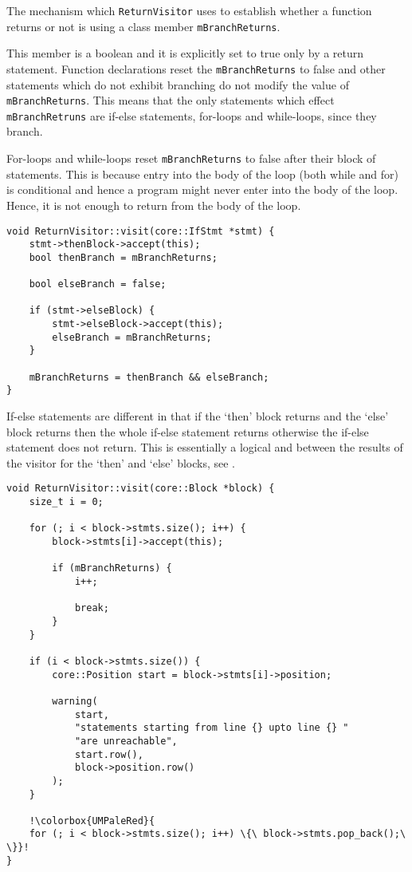The mechanism which \texttt{ReturnVisitor} uses to establish
whether a function returns or not is using a class member
\texttt{mBranchReturns}.

This member is a boolean and it is explicitly set to true only
by a return statement. Function declarations reset the
\texttt{mBranchReturns} to false and other statements which do
not exhibit branching do not modify the value of
\texttt{mBranchReturns}. This means that the only statements
which effect \texttt{mBranchRetruns} are if-else statements,
for-loops and while-loops, since they branch.

For-loops and while-loops reset \texttt{mBranchReturns} to false
after their block of statements. This is because entry into the
body of the loop (both while and for) is conditional and hence a
program might never enter into the body of the loop. Hence, it
is not enough to return from the body of the loop.

\begin{lstlisting}[caption={The \texttt{visit(IfStmt *)} method
in the \texttt{ReturnVisitor} class
(analysis/ReturnVisitor.cpp)},label=lst:iftypecheck]
void ReturnVisitor::visit(core::IfStmt *stmt) {
    stmt->thenBlock->accept(this);
    bool thenBranch = mBranchReturns;

    bool elseBranch = false;

    if (stmt->elseBlock) {
        stmt->elseBlock->accept(this);
        elseBranch = mBranchReturns;
    }

    mBranchReturns = thenBranch && elseBranch;
}
\end{lstlisting}

If-else statements are different in that if the `then' block
returns and the `else' block returns then the whole if-else
statement returns otherwise the if-else statement does not
return. This is essentially a logical and between the results of
the visitor for the `then' and `else' blocks, see
.

\begin{lstlisting}[escapechar=!, caption={The \texttt{visit(Block *)} method
in the \texttt{ReturnVisitor} class
(analysis/ReturnVisitor.cpp)},label=lst:dropinblock]
void ReturnVisitor::visit(core::Block *block) {
    size_t i = 0;

    for (; i < block->stmts.size(); i++) {
        block->stmts[i]->accept(this);

        if (mBranchReturns) {
            i++;

            break;
        }
    }

    if (i < block->stmts.size()) {
        core::Position start = block->stmts[i]->position;

        warning(
            start,
            "statements starting from line {} upto line {} "
            "are unreachable",
            start.row(),
            block->position.row()
        );
    }

    !\colorbox{UMPaleRed}{
    for (; i < block->stmts.size(); i++) \{\ block->stmts.pop_back();\ \}}!
}
\end{lstlisting}


